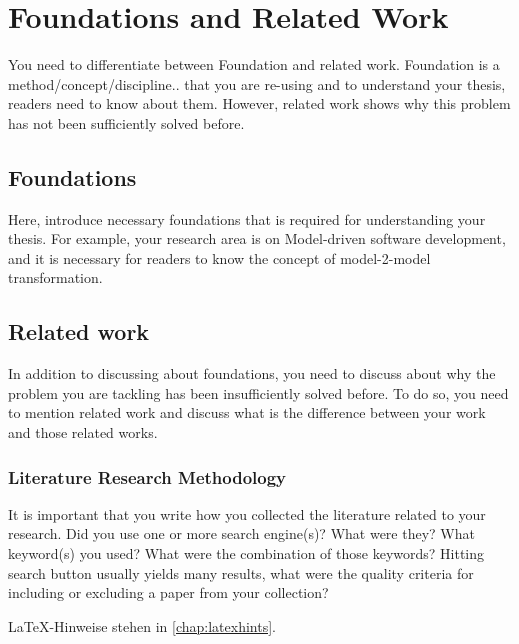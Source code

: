 
\chapter{Foundations and Related Work}
\label{chap:ch2}





You need to differentiate between Foundation and related work. Foundation is a method/concept/discipline.. that you are re-using and to understand your thesis, readers need to know about them. However, related work shows why this problem has not been sufficiently solved before.

\section{Foundations}
Here, introduce necessary foundations that is required for understanding your thesis. For example, your research area is on Model-driven software development, and it is necessary for readers to know the concept of model-2-model transformation.
\section{Related work}
In addition to discussing about foundations, you need to discuss about why the problem you are tackling has been insufficiently solved before. To do so, you need to mention related work and discuss what is the difference between your work and those related works.
\subsection{Literature Research Methodology}
It is important that you write how you collected the literature related to your research. Did you use one or more search engine(s)? What were they? What keyword(s) you used? What were the combination of those keywords?
Hitting search button usually yields many results, what were the quality criteria for including or  excluding a paper from your collection?




LaTeX-Hinweise stehen in \cref{chap:latexhints}.

